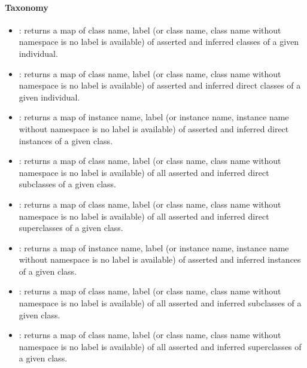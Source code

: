 \paragraph{Taxonomy}
\begin{itemize}

    \item {}: returns a map of {class name,
    label} (or {class name, class name without namespace} is no label is
    available) of asserted and inferred classes of a given individual.

    \item {}: returns a map of {class name,
    label} (or {class name, class name without namespace} is no label is
    available) of asserted and inferred direct classes of a given individual.

    \item {}: returns a map of {instance
    name, label} (or {instance name, instance name without namespace} is no
    label is available) of asserted and inferred direct instances of a given
    class.

    \item {}: returns a map of {class
    name, label} (or {class name, class name without namespace} is no label is
    available) of all asserted and inferred direct subclasses of a given class.

    \item {}: returns a map of {class
    name, label} (or {class name, class name without namespace} is no label is
    available) of all asserted and inferred direct superclasses of a given
    class.

    \item {}: returns a map of {instance name,
    label} (or {instance name, instance name without namespace} is no label is
    available) of asserted and inferred instances of a given class.

    \item {}: returns a map of {class name,
    label} (or {class name, class name without namespace} is no label is
    available) of all asserted and inferred subclasses of a given class.

    \item {}: returns a map of {class name,
    label} (or {class name, class name without namespace} is no label is
    available) of all asserted and inferred superclasses of a given class.
\end{itemize}

